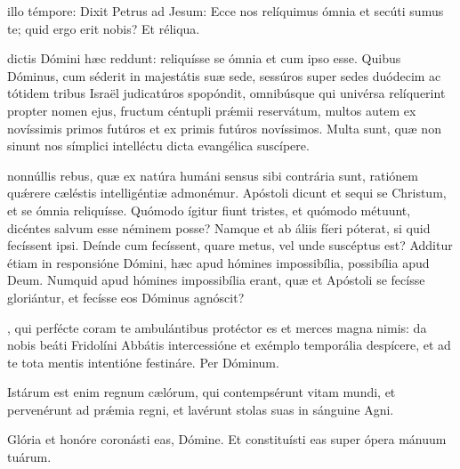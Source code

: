 \documentclass[fontsize=9pt,paper=A6,twoside,BCOR=1mm,DIV=22,headinclude]{scrarticle}
\renewcommand\A\Ant
\begin{document}
\begin{multicols}{2}
{\RVCvi 

 illo témpore: Dixit Petrus ad Jesum: Ecce nos relíquimus ómnia et secúti sumus te; quid ergo erit nobis? Et réliqua.

 dictis Dómini hæc reddunt: reliquísse se ómnia et cum ipso esse. Quibus Dóminus, cum séderit in majestátis suæ sede, sessúros super sedes duódecim ac tótidem tribus Israël judicatúros spopóndit, omnibúsque qui univérsa relíquerint propter nomen ejus, fructum céntupli pr\'æmii reservátum, multos autem ex novíssimis primos futúros et ex primis futúros novíssimos. Multa sunt, quæ non sinunt nos símplici intelléctu dicta evangélica suscípere.

\RVCvii 

 nonnúllis rebus, quæ ex natúra humáni sensus sibi contrária sunt, ratiónem qu\'ærere cæléstis intelligéntiæ admonémur. Apóstoli dicunt et sequi se Christum, et se ómnia reliquísse. Quómodo ígitur fiunt tristes, et quómodo métuunt, dicéntes salvum esse néminem posse? Namque et ab áliis fíeri póterat, si quid fecíssent ipsi. Deínde cum fecíssent, quare metus, vel unde suscéptus est? Additur étiam in responsióne Dómini, hæc apud hómines impossibília, possibília apud Deum. Numquid apud hómines impossibília erant, quæ et Apóstoli se fecísse gloriántur, et fecísse eos Dóminus agnóscit?

\RVCviii 


}


\VRCii 

\BC 

, qui perfécte coram te ambulántibus protéctor es et merces magna nimis: da nobis beáti Fridolíni Abbátis intercessióne et exémplo temporália despícere, et ad te tota mentis intentióne festináre. Per Dóminum.


\A Istárum est enim regnum cælórum, qui contempsérunt vitam mundi, et pervenérunt ad prǽmia regni, et lavérunt stolas suas in sánguine Agni.

\V Glória et honóre coronásti eas, Dómine.
\R Et constituísti eas super ópera mánuum tuárum.


\end{multicols}
\end{document}
